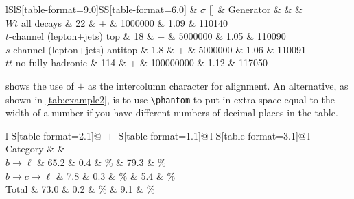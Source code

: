 \documentclass[REPORT=false, UKenglish]{atlasdoc}
\begin{document}
\begin{table}[htbp]
\begin{tcblisting}{}
  \caption{Top quark event MC samples used for this analysis. The cross-section column includes \(k\)-factors and branching ratios.}%
  \label{tab:mcsamples}
  \centering
  \renewcommand{\arraystretch}{1.2}
  \scriptsize
  \begin{tabular}{lSlS[table-format=9.0]SS[table-format=6.0]}
    \toprule
      & {\(\sigma\) [\unit{\pb}]} & Generator
      &  &  & \\
    \midrule
    \(Wt\) all decays                   &  22  & \POWHEG + \PYTHIA &   1000000  & 1.09 & 110140\\
    \(t\)-channel (lepton+jets) top     &  18  & \POWHEG + \PYTHIA &   5000000  & 1.05 & 110090\\
    \(s\)-channel (lepton+jets) antitop &  1.8 & \POWHEG + \PYTHIA &   5000000  & 1.06 & 110091\\
    \(t\bar{t}\) no fully hadronic      & 114  & \POWHEG + \PYTHIA & 100000000  & 1.12 & 117050\\
    \bottomrule
  \end{tabular}
\end{tcblisting}
\end{table}

 shows the use of \(\pm\) as the intercolumn
character for alignment. An alternative, as shown in
\cref{tab:example2}, is to use \verb+\phantom+ to put in extra
space equal to the width of a number if you have different numbers of
decimal places in the table.


\begin{table}[htbp]
\begin{tcblisting}{}
  \caption[Monte Carlo purities in the single lepton sample]{%
    Monte Carlo estimates of the fraction of each process in the single
    lepton data sample. This table uses \enquote{S} format from \texttt{siunitx} and
    \enquote{\(\,\pm\,\)} as the intercolumn separator.}%
  \label{tab:example1}
  \centering
  \begin{tabular}{l S[table-format=2.1]@{\(\;\pm\;\)}S[table-format=1.1]@{\,}l
    S[table-format=3.1]@{\,}l}
    \toprule
    Category             &  & \\
    \midrule
    \(b \to \ell\)       &     65.2 & 0.4 & \%   &  79.3 & \% \\
    \(b \to c \to \ell\) &      7.8 & 0.3 & \%   &   5.4 & \% \\
    Total                &     73.0 & 0.2 & \%   &   9.1 & \% \\
    \bottomrule
  \end{tabular}
\end{tcblisting}
\end{table}
\end{document}
